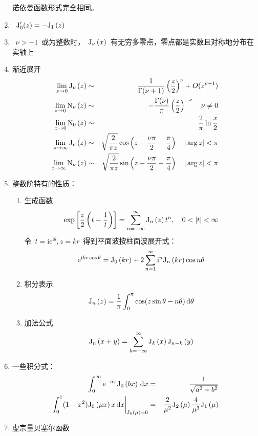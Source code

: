\documentclass[12pt,a4paper]{article}
\newcommand\diff{\,\mathrm{d}}
\renewcommand{\[}{\ $\displaystyle}
\renewcommand{\]}{$\ }%
\newcommand\mi{\mathrm{i}}
\newcommand\e{\mathrm{e}}
\newcommand{\summ}[2][n]{\sum_{#1=#2}^\infty}
\begin{document}
\begin{enumerate}
	     	诺依曼函数形式完全相同。
	     \item \[\mathrm J_0'(z) = -\fj[1]{z}\]
	     \item \[\nu>-1\]或为整数时，\[\fj{x}\]有无穷多零点，零点都是实数且对称地分布在实轴上
	     \item 渐近展开
	     	\begin{eqnarray*}
	     	 \lim_{z\to 0}\fj{z} &\sim & \frac{1}{\Gamma(\nu+1)}\left(\frac z2\right)^\nu + O(z^{\nu+1})\\
	     	 \lim_{z\to 0}\fn{z} &\sim & -\frac{\Gamma(\nu)}{\pi}\left(\frac z2\right)^{-\nu} \quad \nu\neq 0\\
	     	 \lim_{z\to 0}\fn[0]{z} &\sim & \frac{2}{\pi}\ln \frac x2\\
	     	 \lim_{z\to\infty}\fj{z} &\sim & \sqrt{\frac 2{\pi z}}\cos\left(z-\frac{\nu\pi}2 - \frac \pi 4\right)\quad |\arg z|<\pi \\
	     	 \lim_{z\to\infty}\fn{z} &\sim & \sqrt{\frac 2{\pi z}}\sin\left(z-\frac{\nu\pi}2 - \frac \pi 4\right)\quad |\arg z|<\pi
	     	\end{eqnarray*}
	     \item 整数阶特有的性质：
	     	\begin{enumerate}
	     	 \item 生成函数
	     	 	$$
	     	 	  \exp\left[\frac z2\left(t - \frac 1t\right)\right] = \summ{-\infty} \fj[n]{z}t^n, \quad 0<|t|<\infty
	     	 	$$
	     	 	令\[t = \mi\e^{\mi\theta},z=kr\]得到平面波按柱面波展开式：
	     	 	$$
	     	 	  \e^{\mi kr\cos\theta} = \fj[0]{kr} + 2\summ{1}\mi^n\fj[n]{kr}\cos n\theta
	     	 	$$
	     	 \item 积分表示
	     	 	$$
	     	 	  \fj[n]{z} = \frac{1}{\pi}\int_0^\pi\cos(z\sin\theta - n\theta)\diff\theta
	     	 	$$
	     	 \item 加法公式
	     	 	$$
	     	 	  \fj[n]{x+y} = \sum_{k=-\infty}^\infty\fj[k]{x}\fj[n-k]{y}
	     	 	$$
	     	\end{enumerate}
	     \item 一些积分式：
	     	\begin{eqnarray*}
	     	 \int_0^\infty \e^{-ax}\fj[0]{bx} \diff x &=& \frac{1}{\sqrt{a^2+b^2}} \\
	     	 \left.\int_0^1(1-x^2)\fj[0]{\mu x}x\diff x\right|_{\fj[0]{\mu} = 0} &=& \frac{2}{\mu^2}\fj[2]{\mu} \frac{4}{\mu^3}\fj[1]{\mu}
	     	\end{eqnarray*}
	     \item 虚宗量贝塞尔函数
	   		\begin{enumerate}

\end{enumerate}
\end{enumerate}
\end{document}
